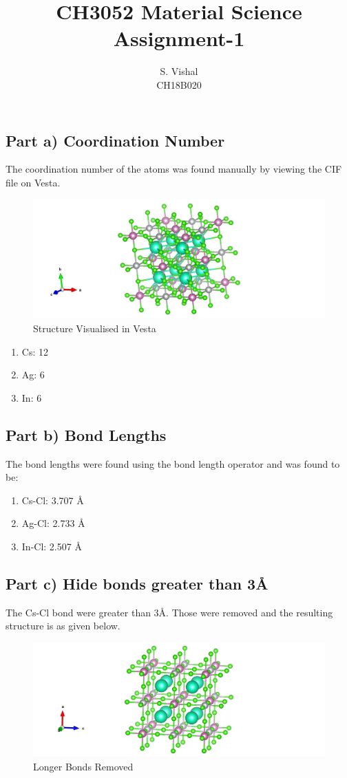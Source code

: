 \documentclass{homework}
\title{CH3052 Material Science Assignment-1}
\author{S. Vishal \\ CH18B020}
\begin{document}
\maketitle

\exercise

\subsection*{Part a) Coordination Number}
The coordination number of the atoms was found manually by viewing the CIF file on Vesta.
\begin{figure}[ht]
\centering
\includegraphics[width=1\textwidth]{Cs2AgInCl6.jpg}
\caption{Structure Visualised in Vesta}
\end{figure}
\begin{enumerate}
    \item Cs: 12
    \item Ag: 6
    \item In: 6
\end{enumerate}

\subsection*{Part b) Bond Lengths}
The bond lengths were found using the bond length operator and was found to be:
\begin{enumerate}
    \item Cs-Cl: 3.707 {\AA}
    \item Ag-Cl: 2.733 {\AA}
    \item In-Cl: 2.507 {\AA}
\end{enumerate}

\subsection*{Part c) Hide bonds greater than 3\AA}
The Cs-Cl bond were greater than 3\AA. Those were removed and the resulting structure is as given below.
\begin{figure}[ht]
\centering
\includegraphics[width=1\textwidth]{part c.jpg}
\caption{Longer Bonds Removed}
\end{figure}
\end{document}
